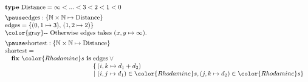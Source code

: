\documentclass[dvipsnames,fleqn]{beamer}
\newcommand\kw\textbf
\newcommand\name\text
\newcommand\x\times
\newcommand\N{\mathbb{N}}
\newcommand\eset[1]{\{{#1}\}}
\newcommand\efix[1]{\kw{fix}~{#1}~\kw{is}\;}
\newcommand\efixh[1]{\efix{\hilit #1}}
\newcommand\shaded{\color{gray}}
\newcommand\hilit{\color{Rhodamine}}
\begin{document}
\newcommand\tmap[2]{\{{#1} \mapsto {#2}\}}
\newcommand\emap[1]{\eset{#1}}
\newcommand\comment[1]{\text{\shaded #1}}

\begin{frame}
  \[ 
  \begin{array}{l}
    \kw{type}\ \name{Distance} = \infty < ... < 3 < 2 < 1 < 0
    \\[1ex]\pause
    \name{edges} : \tmap{\N \x \N}{\name{Distance}}\\
    \name{edges} = \emap{(0,1 \mapsto 3),\, (1,2 \mapsto 2)}
    \\
    \comment{-{}- Otherwise \name{edges} takes $(x,y \mapsto \infty)$.}
    \\[1ex]\pause
    \name{shortest} : \tmap{\N \x \N}{\name{Distance}}\\
    \name{shortest} = \\
    \quad\efixh{s} \name{edges} \vee {}\\
    \quad\phantom{\efixh{s}} \{\,(i,k \mapsto d_1 + d_2)\\
    \quad\phantom{\efixh{s}} \!\mathrel{|} (i,j \mapsto d_1) \in {\hilit s},
    (j,k \mapsto d_2) \in {\hilit s}\}
  \end{array}
  \]
\end{frame}
\end{document}
